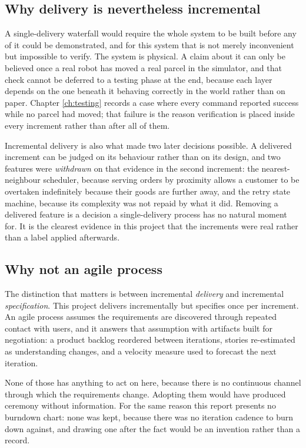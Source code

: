 \documentclass[12pt,a4paper]{report}
\begin{document}
\subsection*{Why delivery is nevertheless incremental}
A single-delivery waterfall would require the whole system to be built before any of it could be
demonstrated, and for this system that is not merely inconvenient but impossible to verify. The
system is physical. A claim about it can only be believed once a real robot has moved a real parcel
in the simulator, and that check cannot be deferred to a testing phase at the end, because each
layer depends on the one beneath it behaving correctly in the world rather than on paper. Chapter
\ref{ch:testing} records a case where every command reported success while no parcel had moved;
that failure is the reason verification is placed inside every increment rather than after all of
them.

Incremental delivery is also what made two later decisions possible. A delivered increment can be
judged on its behaviour rather than on its design, and two features were \emph{withdrawn} on that
evidence in the second increment: the nearest-neighbour scheduler, because serving orders by
proximity allows a customer to be overtaken indefinitely because their goods are further away, and
the retry state machine, because its complexity was not repaid by what it did. Removing a delivered
feature is a decision a single-delivery process has no natural moment for. It is the clearest
evidence in this project that the increments were real rather than a label applied afterwards.

\subsection*{Why not an agile process}
The distinction that matters is between incremental \emph{delivery} and incremental
\emph{specification}. This project delivers incrementally but specifies once per increment. An
agile process assumes the requirements are discovered through repeated contact with users, and it
answers that assumption with artifacts built for negotiation: a product backlog reordered between
iterations, stories re-estimated as understanding changes, and a velocity measure used to forecast
the next iteration.

None of those has anything to act on here, because there is no continuous channel through which the
requirements change. Adopting them would have produced ceremony without information. For the same
reason this report presents no burndown chart: none was kept, because there was no iteration
cadence to burn down against, and drawing one after the fact would be an invention rather than a
record.
\end{document}
